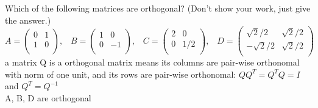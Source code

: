 \documentclass[11pt]{article}
\begin{document}
Which of the following matrices are orthogonal?
(Don't show your work, just give the answer.)
$$
   A =
   \left(
   \begin{array}{cc}
    0 & 1 \\ 	
    1 & 0 \\ 
   \end{array} \right), 
   \hspace{10pt}
   B =
   \left(
   \begin{array}{cc}
    1 & 0 \\ 	
    0 & -1 \\ 
   \end{array} \right), 
   \hspace{10pt}
   C =
   \left(
   \begin{array}{cc}
    2 & 0 \\ 	
    0 & 1/2 \\ 
   \end{array} \right), 
   \hspace{10pt}
   D =
   \left(
   \begin{array}{cc}
    \sqrt 2 / 2 & \sqrt 2 / 2 \\ 	
    -\sqrt 2 / 2 & \sqrt 2 / 2 \\ 	
   \end{array} \right)
$$
a matrix Q is a orthogonal matrix means its columns are pair-wise orthonomal with norm of one unit, and its rows are pair-wise orthonomal: $QQ^T = Q^TQ=I$ and $Q^T=Q^{-1}$\\
A, B, D are orthogonal
\end{document}
